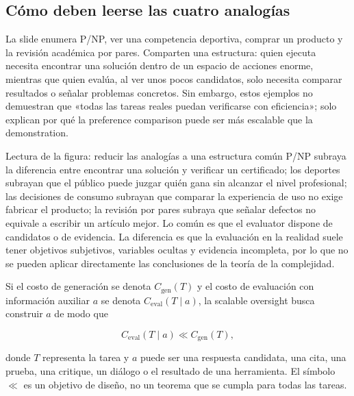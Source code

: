 \subsection{Cómo deben leerse las cuatro analogías}

La slide enumera P/NP, ver una competencia deportiva, comprar un producto y la revisión académica por pares. Comparten una estructura: quien ejecuta necesita encontrar una solución dentro de un espacio de acciones enorme, mientras que quien evalúa, al ver unos pocos candidatos, solo necesita comparar resultados o señalar problemas concretos. Sin embargo, estos ejemplos no demuestran que «todas las tareas reales puedan verificarse con eficiencia»; solo explican por qué la preference comparison puede ser más escalable que la demonstration.


\begin{knowledgebox}{Lectura de la figura: reducir las analogías a una estructura común}
P/NP subraya la diferencia entre encontrar una solución y verificar un certificado; los deportes subrayan que el público puede juzgar quién gana sin alcanzar el nivel profesional; las decisiones de consumo subrayan que comparar la experiencia de uso no exige fabricar el producto; la revisión por pares subraya que señalar defectos no equivale a escribir un artículo mejor. Lo común es que el evaluator dispone de candidatos o de evidencia. La diferencia es que la evaluación en la realidad suele tener objetivos subjetivos, variables ocultas y evidencia incompleta, por lo que no se pueden aplicar directamente las conclusiones de la teoría de la complejidad.
\end{knowledgebox}

Si el costo de generación se denota $C_{\mathrm{gen}}(T)$ y el costo de evaluación con información auxiliar $a$ se denota $C_{\mathrm{eval}}(T\mid a)$, la scalable oversight busca construir $a$ de modo que

\[
C_{\mathrm{eval}}(T\mid a) \ll C_{\mathrm{gen}}(T),
\]

donde $T$ representa la tarea y $a$ puede ser una respuesta candidata, una cita, una prueba, una critique, un diálogo o el resultado de una herramienta. El símbolo $\ll$ es un objetivo de diseño, no un teorema que se cumpla para todas las tareas.

